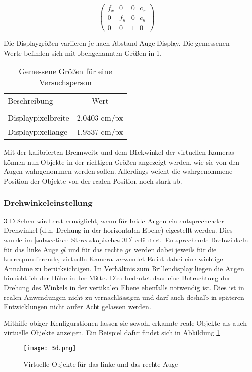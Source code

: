 \begin{equation}
\begin{pmatrix}
f_x & 0& 0& c_x \\
0 & f_y & 0 & c_y\\ 
0 & 0&   1 &  0  
\end{pmatrix}
\label{table:instrisische Kameraparameter}
\end{equation}

Die Displaygrößen variieren je nach Abstand Auge-Display. Die gemessenen Werte befinden sich mit obengenannten Größen in \ref{table:Messwerte DisplayAuge}.
%
 \begin{table}[ht]

 \begin{tabular}{lc} 
  Beschreibung & Wert \\ \\
  Displaypixelbreite & 2.0403 cm/px \\
  Displaypixellänge &  1.9537 cm/px \\
 \end{tabular}
 \caption{Gemessene Größen für eine Versuchsperson}
 \label{table:Messwerte DisplayAuge}
 \end{table}



%
Mit der kalibrierten Brennweite und dem Blickwinkel der virtuellen Kameras können nun Objekte in der richtigen Größen angezeigt werden, wie sie von den Augen wahrgenommen werden sollen. Allerdings weicht die wahrgenommene Position der Objekte von der realen Position noch stark ab. 

\subsubsection{Drehwinkeleinstellung}
3-D-Sehen wird erst ermöglicht, wenn für beide Augen ein entsprechender Drehwinkel (d.h. Drehung in der horizontalen Ebene) eigestellt werden. Dies wurde im \ref{subsection: Stereoskopisches 3D} erläutert.  Entsprechende Drehwinkeln für das linke Auge $gl$ und für das rechte $gr$ werden dabei jeweils für die korrespondierende, virtuelle Kamera verwendet
Es ist dabei eine wichtige Annahme zu berücksichtigen. Im Verhältnis zum Brillendisplay liegen die Augen hinsichtlich der Höhe in der Mitte. Dies bedeutet dass eine Betrachtung der Drehung des Winkels in der vertikalen Ebene ebenfalls notwendig ist. Dies ist in realen Anwendungen nicht zu vernachlässigen und darf auch deshalb in späteren Entwicklungen nicht außer Acht gelassen werden.

Mithilfe obiger Konfigurationen lassen sie sowohl erkannte reale Objekte als auch virtuelle Objekte anzeigen.  Ein Beispiel dafür findet sich in Abbildung \ref{fig:Virtuelle Quadrate aus Prezi}

\begin{figure}[h]
   \centering
   \texttt{[image: 3d.png]}
   \caption{Virtuelle Objekte für das linke und das rechte Auge}
   \label{fig:Virtuelle Quadrate aus Prezi}
\end{figure}


